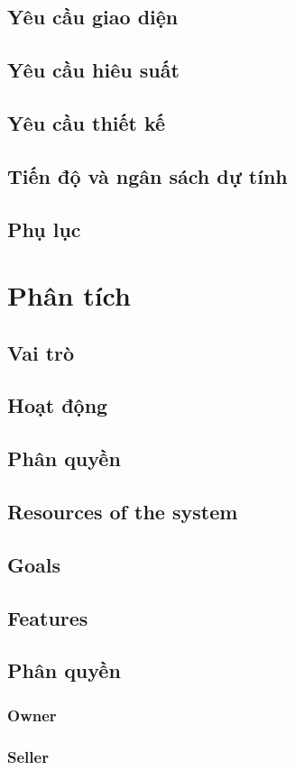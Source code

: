 \documentclass{report}
\begin{document}
\section{Yêu cầu giao diện}
\section{Yêu cầu hiêu suất}
\section{Yêu cầu thiết kế}
\section{Tiến độ và ngân sách dự tính}
\section{Phụ lục}
\chapter{Phân tích}
\section{Vai trò}
\section{Hoạt động}
\section{Phân quyền}
\section{Resources of the system}
\section{Goals}
\section{Features}
\section{Phân quyền}
\subsection{Owner}
\subsection{Seller}
\end{document}
